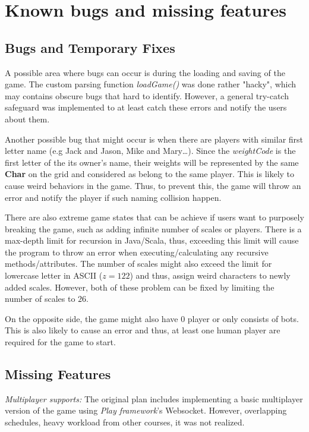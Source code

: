 \documentclass[12pt]{article}
\begin{document}
\section{Known bugs and missing features}

\subsection{Bugs and Temporary Fixes}

A possible area where bugs can occur is during the loading and saving of the
game. The custom parsing function \textit{loadGame()} was done rather "hacky",
which may contains obscure bugs that hard to identify. However, a general
try-catch safeguard was implemented to at least catch these errors and notify
the users about them.

Another possible bug that might occur is when there are players with similar
first letter name (e.g Jack and Jason, Mike and Mary\dots). Since the
\textit{weightCode} is the first letter of the its owner's name, their weights
will be represented by the same \textbf{Char} on the grid and considered as
belong to the same player. This is likely to cause weird behaviors in the game.
Thus, to prevent this, the game will throw an error and notify the player if
such naming collision happen.

There are also extreme game states that can be achieve if users want to
purposely breaking the game, such as adding infinite number of scales or
players. There is a max-depth limit for recursion in Java/Scala, thus, exceeding
this limit will cause the program to throw an error when executing/calculating
any recursive methods/attributes. The number of scales might also exceed the
limit for lowercase letter in ASCII ($z = 122$) and thus, assign weird
characters to newly added scales.  However, both of these problem can be fixed
by limiting the number of scales to $26$.

On the opposite side, the game might also have $0$ player or only consists of
bots. This is also likely to cause an error and thus, at least one human player
are required for the game to start.

\subsection{Missing Features}

\textit{Multiplayer supports:} The original plan includes implementing a basic
multiplayer version of the game using \textit{Play framework}'s Websocket.
However, overlapping schedules, heavy workload from other courses, it was not
realized.
\end{document}
